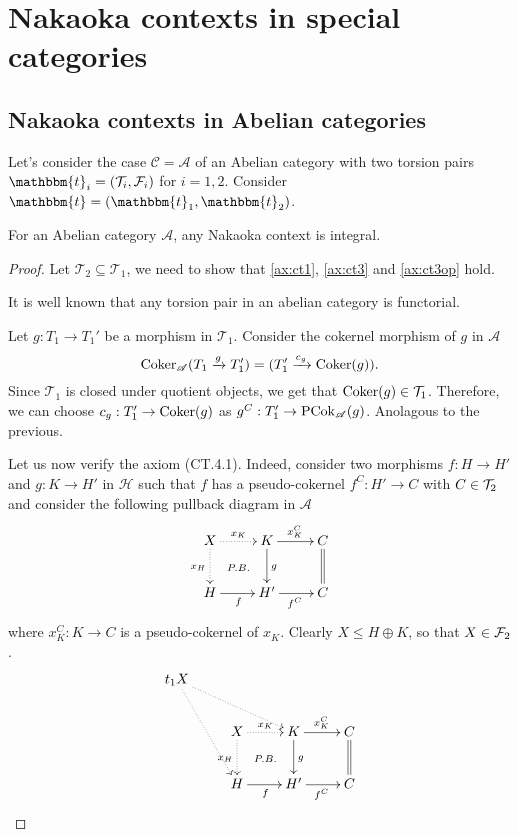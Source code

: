 













\section{Nakaoka contexts in special categories}\label{sec:nakaoka_special}
\subsection{Nakaoka contexts in Abelian categories}

Let's consider the case $\mathscr{C}=\mathscr{A}$ of an Abelian category with
two torsion pairs $\mathbbm{t}_i=(\mathcal{T}_i,\mathcal{F}_i)$ for $i=1,2$.
Consider $\mathbbm{t}=(\mathbbm{t}_1,\mathbbm{t}_2)$.

\begin{lemma}\label{rmk:2.2}
For an Abelian category $\mathscr{A}$, any Nakaoka context is integral.
\end{lemma}
\begin{proof}
  Let $\mathcal{T}_2\subseteq\mathcal{T}_1$, we need to show that \ref{ax:ct1},
  \ref{ax:ct3} and \ref{ax:ct3op} hold.
  \begin{torsionaxioms}
    \item It is well known that any torsion pair in an abelian category is functorial.
    \setcounter{enumi}{2}
    \item Let $g:T_1\to T_1'$ be a morphism in $\mathcal{T}_1$. Consider the cokernel morphism
    of $g$ in $\mathscr{A}$
    \begin{equation*}
      \operatorname{Coker}_\mathscr{A}(T_1\xrightarrow{g}T_1')=(T_1'\xrightarrow{c_g}\operatorname{Coker}(g)).
    \end{equation*}
    Since $\mathcal{T}_1$ is closed under quotient objects, we get that $\operatorname{Coker}(g)\in\mathcal{T}_1$.
    Therefore, we can choose $c_g:T_1'\to\operatorname{Coker}(g)$ as $g^C:T_1'\to\operatorname{PCok}_\mathscr{A}(g)$.
    \varitem{^\ast} Anolagous to the previous.
  \end{torsionaxioms}

\bigskip\bigskip
Let us now verify the axiom (CT.4.1). Indeed, consider two morphisms $f\colon H\to H'$ and $g\colon K\to H'$ in $\mathcal{H}$ such that $f$ has a pseudo-cokernel $f^C\colon H'\to C$ with $C\in \mathcal{T}_2$ and consider the following pullback diagram in $\mathscr{A}$
\[
\xymatrix{
X\ar@{}[dr]|{P.B.}\ar@{.>}[d]_{x_H}\ar@{.>}[r]^{x_K}&K\ar[r]^{x_K^C}\ar[d]^{g}&C\ar@{=}[d]\\
H\ar[r]_f&H'\ar[r]_{f^C}&C
}
\]
where $x_K^C\colon K\to C$ is a pseudo-cokernel of $x_K$. Clearly $X\leq H\oplus K$, so that $X\in \mathcal{F}_2$.
\[
\xymatrix{
t_1X\ar@{.>}[rrd]\ar@{.>}[ddr]\\
&X\ar@{}[dr]|{P.B.}\ar@{.>}[d]_{x_H}\ar@{.>}[r]^{x_K}&K\ar[r]^{x_K^C}\ar[d]^{g}&C\ar@{=}[d]\\
&H\ar[r]_f&H'\ar[r]_{f^C}&C
}
\]
\end{proof}


